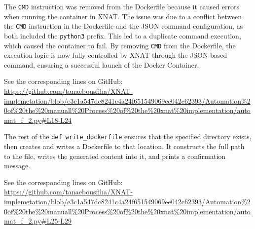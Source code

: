 The \texttt{CMD} instruction was removed from the Dockerfile because it caused errors when running the container in XNAT. The issue was due to a conflict between the \texttt{CMD} instruction in the Dockerfile and the JSON command configuration, as both included the \texttt{python3} prefix. This led to a duplicate command execution, which caused the container to fail. By removing \texttt{CMD} from the Dockerfile, the execution logic is now fully controlled by XNAT through the JSON-based command, ensuring a successful launch of the Docker Container.



\lstset{style=allblack}



\lstset{inputpath=en/content}



\noindent\footnotesize See the corresponding lines on GitHub:\url{ https://github.com/tanaebousfiha/XNAT-implemetation/blob/e3c1a547dc8241c4a24f651549069ee042c62393/Automation%20of%20the%20manuall%20Process%20of%20the%20xnat%20implementation/automat_f_2.py#L18-L24}




The rest of the \texttt{def write\_dockerfile} ensures that the specified directory exists, then creates and writes a Dockerfile to that location. It constructs the full path to the file, writes the generated content into it, and prints a confirmation message.






\noindent\footnotesize See the corresponding lines on GitHub:\url{ https://github.com/tanaebousfiha/XNAT-implemetation/blob/e3c1a547dc8241c4a24f651549069ee042c62393/Automation%20of%20the%20manuall%20Process%20of%20the%20xnat%20implementation/automat_f_2.py#L25-L29}







